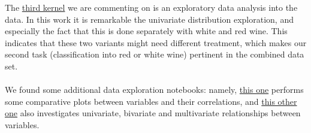 \documentclass[10pt]{article}
\begin{document}
The \href{https://www.kaggle.com/danielpanizzo/red-and-white-wine-quality}{third kernel} we are commenting on is an exploratory data analysis into the data. In this work it is remarkable the univariate distribution exploration, and especially the fact that this is done separately with white and red wine. This indicates that these two variants might need different treatment, which makes our second task (classification into red or white wine) pertinent in the combined data set. \\ \ \\
We found some additional data exploration notebooks: namely, \href{https://rstudio-pubs-static.s3.amazonaws.com/57835_c4ace81da9dc45438ad0c286bcbb4224.html}{this one} performs some comparative plots between variables and their correlations, and \href{http://rstudio-pubs-static.s3.amazonaws.com/219996_9cc8cf9f2e7e41fe8912454c3ad2685a.html}{this other one} also investigates univariate, bivariate and multivariate relationships between variables.
\end{document}
